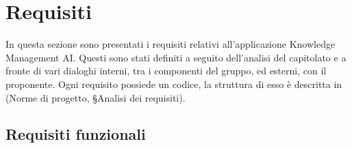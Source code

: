 \documentclass[10pt, a4paper]{article}
\begin{document}
\newpage
\section{Requisiti}
In questa sezione sono presentati i requisiti relativi all’applicazione Knowledge Management AI. Questi sono stati definiti a seguito dell’analisi del capitolato e a fronte di vari dialoghi interni, tra i componenti del gruppo, ed esterni, con il proponente. Ogni requisito possiede un codice, la struttura di esso è descritta in (Norme di progetto, \S Analisi dei requisiti).

\subsection{Requisiti funzionali}

\renewcommand{\arraystretch}{1.5}
\end{document}
